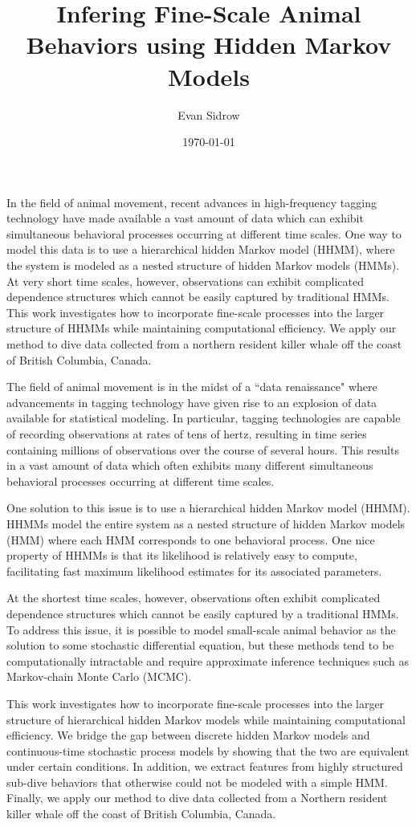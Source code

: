 \documentclass[10pt]{article}
\title{Infering Fine-Scale Animal Behaviors using Hidden Markov Models}
\author{Evan Sidrow}
\date{\today}
\begin{document}
\maketitle

\abstract

In the field of animal movement, recent advances in high-frequency tagging technology have made available a vast amount of data which can exhibit simultaneous behavioral processes occurring at different time scales. One way to model this data is to use a hierarchical hidden Markov model (HHMM), where the system is modeled as a nested structure of hidden Markov models (HMMs). At very short time scales, however, observations can exhibit complicated dependence structures which cannot be easily captured by traditional HMMs. This work investigates how to incorporate fine-scale processes into the larger structure of HHMMs while maintaining computational efficiency. We apply our method to dive data collected from a northern resident killer whale off the coast of British Columbia, Canada.

The field of animal movement is in the midst of a ``data renaissance" where advancements in tagging technology have given rise to an explosion of data available for statistical modeling. In particular, tagging technologies are capable of recording observations at rates of tens of hertz, resulting in time series containing millions of observations over the course of several hours. This results in a vast amount of data which often exhibits many different simultaneous behavioral processes occurring at different time scales. 

One solution to this issue is to use a hierarchical hidden Markov model (HHMM). HHMMs model the entire system as a nested structure of hidden Markov models (HMM) where each HMM corresponds to one behavioral process. One nice property of HHMMs is that its likelihood is relatively easy to compute, facilitating fast maximum likelihood estimates for its associated parameters.  

At the shortest time scales, however, observations often exhibit complicated dependence structures which cannot be easily captured by a traditional HMMs. To address this issue, it is possible to model small-scale animal behavior as the solution to some stochastic differential equation, but these methods tend to be computationally intractable and require approximate inference techniques such as Markov-chain Monte Carlo (MCMC).

This work investigates how to incorporate fine-scale processes into the larger structure of hierarchical hidden Markov models while maintaining computational efficiency. We bridge the gap between discrete hidden Markov models and continuous-time stochastic process models by showing that the two are equivalent under certain conditions. In addition, we extract features from highly structured sub-dive behaviors that otherwise could not be modeled with a simple HMM. Finally, we apply our method to dive data collected from a Northern resident killer whale off the coast of British Columbia, Canada.

%







\newpage




\newpage


\end{document}
